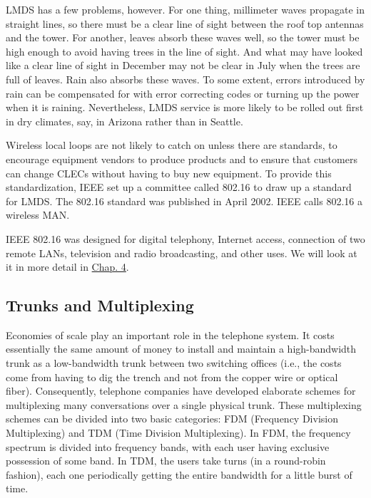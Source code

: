 LMDS has a few problems, however. For one thing, millimeter waves
propagate in straight lines, so there must be a clear line of sight
between the roof top antennas and the tower. For another, leaves absorb
these waves well, so the tower must be high enough to avoid having trees
in the line of sight. And what may have looked like a clear line of
sight in December may not be clear in July when the trees are full of
leaves. Rain also absorbs these waves. To some extent, errors introduced
by rain can be compensated for with error correcting codes or turning up
the power when it is raining. Nevertheless, LMDS service is more likely
to be rolled out first in dry climates, say, in Arizona rather than in
Seattle.

Wireless local loops are not likely to catch on unless there are
standards, to encourage equipment vendors to produce products and to
ensure that customers can change CLECs without having to buy new
equipment. To provide this standardization, IEEE set up a committee
called 802.16 to draw up a standard for LMDS. The 802.16 standard was
published in April 2002. IEEE calls 802.16 a {wireless MAN}.

IEEE 802.16 was designed for digital telephony, Internet access,
connection of two remote LANs, television and radio broadcasting, and
other uses. We will look at it in more detail in
\protect\hyperlink{0130661023_ch04.htmlux5cux23ch04}{Chap. 4}.

\protect\hypertarget{0130661023_ch02lev1sec5.htmlux5cux23ch02lev2sec20}{}{}

\subsection{Trunks and Multiplexing}

Economies of scale play an important role in the telephone system. It
costs essentially the same amount of money to install and maintain a
high-bandwidth trunk as a low-bandwidth trunk between two switching
offices (i.e., the costs come from having to dig the trench and not from
the copper wire or optical fiber). Consequently, telephone companies
have developed elaborate schemes for multiplexing many conversations
over a single physical trunk. These multiplexing schemes can be divided
into two basic categories: {FDM} ({Frequency Division Multiplexing}) and
{TDM} ({Time Division Multiplexing}). In FDM, the frequency spectrum is
divided into frequency bands, with each user having exclusive possession
of some band. In TDM, the users take turns (in a round-robin fashion),
each one periodically getting the entire bandwidth for a little burst of
time.

